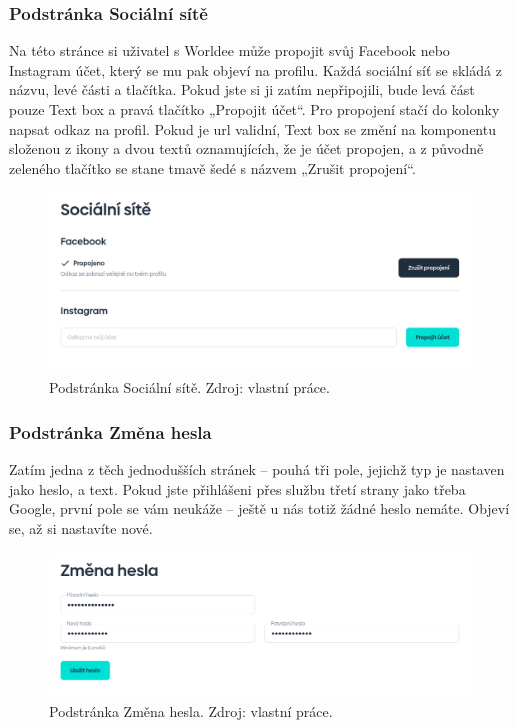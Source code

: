 \newpage
\subsubsection{Podstránka Sociální sítě}
Na této stránce si uživatel s Worldee může propojit svůj Facebook nebo Instagram účet, který se mu pak objeví na profilu. Každá sociální síť se skládá z názvu, levé části a tlačítka. Pokud jste si ji zatím nepřipojili, bude levá část pouze Text box a pravá tlačítko „Propojit účet“. Pro propojení stačí do kolonky napsat odkaz na profil. Pokud je url validní, Text box se změní na komponentu složenou z ikony a dvou textů oznamujících, že je účet propojen, a z původně zeleného tlačítko se stane tmavě šedé s názvem „Zrušit propojení“.

\begin{figure}[!h]
    \centering
    \includegraphics[width=1\linewidth]{obrazky/social_networks.png}
    \caption{Podstránka Sociální sítě. Zdroj: vlastní práce.}
\end{figure}


\newpage
\subsubsection{Podstránka Změna hesla}
Zatím jedna z těch jednodušších stránek – pouhá tři pole, jejichž typ je nastaven jako heslo, a text. Pokud jste přihlášeni přes službu třetí strany jako třeba Google, první pole se vám neukáže – ještě u nás totiž žádné heslo nemáte. Objeví se, až si nastavíte nové.

\begin{figure}[!h]
    \centering
    \includegraphics[width=1\linewidth]{obrazky/change_password.png}
    \caption{Podstránka Změna hesla. Zdroj: vlastní práce.}
\end{figure}


